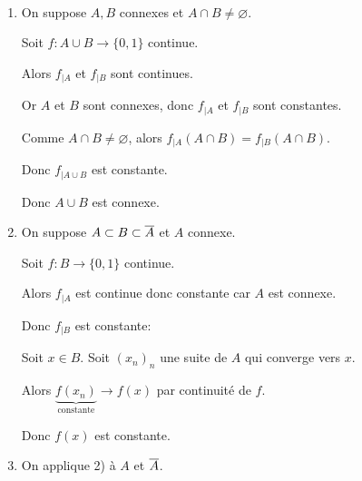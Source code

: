 \documentclass[french,a4paper,10pt]{article}
\begin{document}
	\begin{myproof}\,
		\begin{enumerate}[label=\arabic*)]
			\item On suppose $A, B$ connexes et $A\cap B\ne\varnothing$.

			Soit $f\colon A\cup B\to\{0,1\}$ continue.

			Alors $f_{|A}$ et $f_{|B}$ sont continues.

			Or $A$ et $B$ sont connexes, donc $f_{|A}$ et $f_{|B}$ sont constantes.

			Comme $A\cap B\ne\varnothing$, alors $f_{|A}(A\cap B)=f_{|B}(A\cap B)$.

			Donc $f_{|A\cup B}$ est constante.

			Donc $A\cup B$ est connexe.

		\item On suppose $A\subset B\subset \overline{A}$ et $A$ connexe.

			Soit $f\colon B\to\{0,1\}$ continue.

			Alors $f_{|A}$ est continue donc constante car $A$ est connexe.

			Donc $f_{|B}$ est constante:

			Soit $x\in B$. Soit ${(x_n)}_n$ une suite de $A$ qui converge vers $x$.

			Alors $\underbrace{f(x_n)}_{\text{constante}}\to f(x)$ par continuité de $f$.

			Donc $f(x)$ est constante.

		\item On applique 2) à $A$ et $\overline{A}$.
		\end{enumerate}
	\end{myproof}
\end{document}

